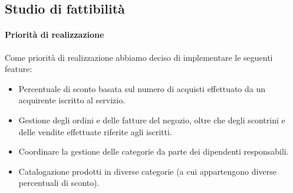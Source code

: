 \subsection{Studio di fattibilit\`a} 

\paragraph*{Priorit\`a di realizzazione}
Come priorit\`a di realizzazione abbiamo deciso di implementare le seguenti feature:
\begin{itemize}
\item Percentuale di sconto basata sul numero di acquisti effettuato da un acquirente iscritto al servizio.
\item Gestione degli ordini e delle fatture del negozio, oltre che degli scontrini e delle vendite effettuate riferite agli iscritti.
\item Coordinare la gestione delle categorie da parte dei dipendenti responsabili.
\item Catalogazione prodotti in diverse categorie (a cui appartengono diverse percentuali di sconto).
\end{itemize}
